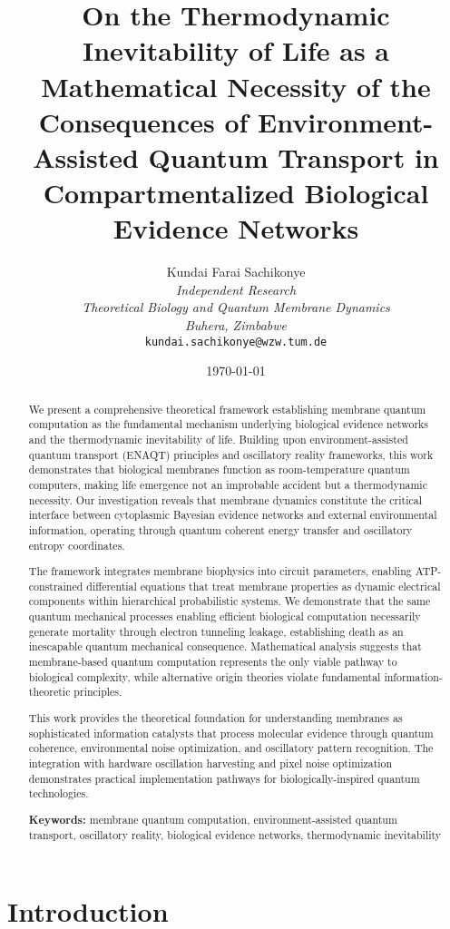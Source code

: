 \documentclass[12pt,a4paper]{article}
\title{\textbf{On the Thermodynamic Inevitability of Life as a Mathematical Necessity of the Consequences of Environment-Assisted Quantum Transport in Compartmentalized Biological Evidence Networks}}
\author{
Kundai Farai Sachikonye\\
\textit{Independent Research}\\
\textit{Theoretical Biology and Quantum Membrane Dynamics}\\
\textit{Buhera, Zimbabwe}\\
\texttt{kundai.sachikonye@wzw.tum.de}
}
\date{\today}
\begin{document}
\maketitle

\begin{abstract}
We present a comprehensive theoretical framework establishing membrane quantum computation as the fundamental mechanism underlying biological evidence networks and the thermodynamic inevitability of life. Building upon environment-assisted quantum transport (ENAQT) principles and oscillatory reality frameworks, this work demonstrates that biological membranes function as room-temperature quantum computers, making life emergence not an improbable accident but a thermodynamic necessity. Our investigation reveals that membrane dynamics constitute the critical interface between cytoplasmic Bayesian evidence networks and external environmental information, operating through quantum coherent energy transfer and oscillatory entropy coordinates.

The framework integrates membrane biophysics into circuit parameters, enabling ATP-constrained differential equations that treat membrane properties as dynamic electrical components within hierarchical probabilistic systems. We demonstrate that the same quantum mechanical processes enabling efficient biological computation necessarily generate mortality through electron tunneling leakage, establishing death as an inescapable quantum mechanical consequence. Mathematical analysis suggests that membrane-based quantum computation represents the only viable pathway to biological complexity, while alternative origin theories violate fundamental information-theoretic principles.

This work provides the theoretical foundation for understanding membranes as sophisticated information catalysts that process molecular evidence through quantum coherence, environmental noise optimization, and oscillatory pattern recognition. The integration with hardware oscillation harvesting and pixel noise optimization demonstrates practical implementation pathways for biologically-inspired quantum technologies.

\textbf{Keywords:} membrane quantum computation, environment-assisted quantum transport, oscillatory reality, biological evidence networks, thermodynamic inevitability
\end{abstract}

\section{Introduction}
\end{document}
